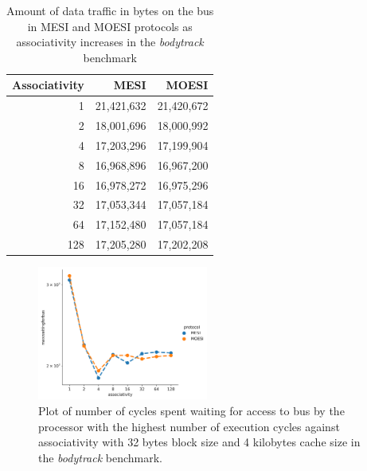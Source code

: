 \documentclass[nonacm,acmsmall,screen,11pt]{acmart}
\begin{document}
\begin{table}[htb!]
  \centering
  \caption{Amount of data traffic in bytes on the bus in MESI and MOESI protocols as associativity increases in the \textit{bodytrack} benchmark}
  \label{tab:datatraffic}
  \begin{tabular}{r|r|r}
    \textbf{Associativity} & \textbf{MESI} & \textbf{MOESI} \\ \hline
    1                      & 21,421,632    & 21,420,672     \\
    2                      & 18,001,696    & 18,000,992     \\
    4                      & 17,203,296    & 17,199,904     \\
    8                      & 16,968,896    & 16,967,200     \\
    16                     & 16,978,272    & 16,975,296     \\
    32                     & 17,053,344    & 17,057,184     \\
    64                     & 17,152,480    & 17,057,184     \\
    128                    & 17,205,280    & 17,202,208     \\
  \end{tabular}
\end{table}

\begin{figure}[htb!]
  \centering
  \includegraphics[width=0.5\textwidth]{maxwaitingforbus}
  \caption{Plot of number of cycles spent waiting for access to bus by the processor with the highest number of execution cycles against associativity with 32 bytes block size and 4 kilobytes cache size in the \textit{bodytrack} benchmark.}
  \label{fig:maxwaitingforbus}
\end{figure}
\end{document}
